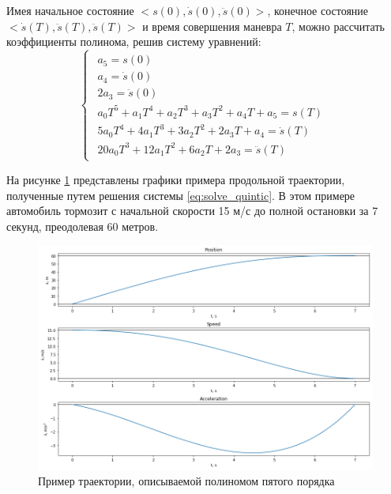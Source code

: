 Имея начальное состояние $<s(0), \dot{s}(0), \ddot{s}(0)>$, конечное состояние $<\dot{s}(T), \ddot{s}(T), \ddot{s}(T)>$
и время совершения маневра $T$, можно рассчитать коэффициенты полинома, решив систему уравнений:
\begin{equation}
      \label{eq:solve_quintic}
      \begin{cases}
            \begin{array}
                  {lcl} a_5 = s(0) \\
                        a_4 = \dot{s}(0) \\
                        2a_3 = \ddot{s}(0) \\
                        a_0T^5   + a_1T^4 + a_2T^3 + a_3T^2 + a_4T + a_5 = s(T) \\
                        5a_0T^4  + 4a_1T^3 + 3a_2T^2 + 2a_3T + a_4 = \dot{s}(T)\\
                        20a_0T^3 + 12a_1T^2 + 6a_2T + 2a_3 = \ddot{s}(T)
            \end{array}
      \end{cases}
\end{equation}

На рисунке \ref{img:quntic_example} представлены графики примера продольной траектории, полученные путем решения
системы \ref{eq:solve_quintic}. В этом примере автомобиль тормозит с начальной скорости 15 м/с до полной остановки
за 7 секунд, преодолевая 60 метров.

\begin{figure}[h]
      \centering
      \includegraphics[width=\linewidth]{images/quintic_example}
      \caption{Пример траектории, описываемой полиномом пятого порядка}
      \label{img:quntic_example}
\end{figure}

